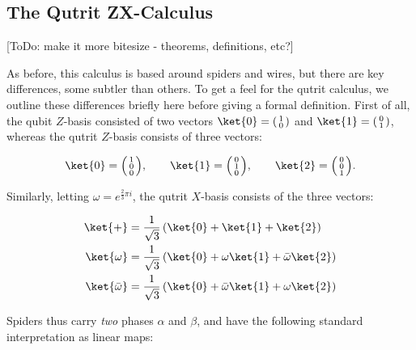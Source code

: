 \subsection{The Qutrit ZX-Calculus}

[ToDo: make it more bitesize - theorems, definitions, etc?]

As before, this calculus is based around spiders and wires, but there are key differences, some subtler than others. To get a feel for the qutrit calculus, we outline these differences briefly here before giving a formal definition. First of all, the qubit $Z$-basis consisted of two vectors $\ket{0} = \smallcolvec{1\\0}$ and $\ket{1} = \smallcolvec{0\\1}$, whereas the qutrit $Z$-basis consists of three vectors:

\begin{equation}
	\ket{0} = \smallcolvec{1\\0\\0}, \hspace{20pt}
	\ket{1} = \smallcolvec{0\\1\\0}, \hspace{20pt}
	\ket{2} = \smallcolvec{0\\0\\1}. 
\end{equation}
 
Similarly, letting $\omega = e^{\frac{2}{3}\pi i}$, the qutrit $X$-basis consists of the three vectors: 

\begin{align}
	\ket{+} &= \frac{1}{\sqrt{3}} \left(\ket{0} + \ket{1} + \ket{2}\right)\\
	\ket{\omega} &= \frac{1}{\sqrt{3}} \left(\ket{0} + \omega\ket{1} + \bar{\omega}\ket{2}\right)\\
	\ket{\bar{\omega}} &= \frac{1}{\sqrt{3}} \left(\ket{0} + \bar{\omega}\ket{1} + \omega\ket{2}\right)
\end{align}

Spiders thus carry \textit{two} phases $\alpha$ and $\beta$, and have the following standard interpretation as linear maps:

